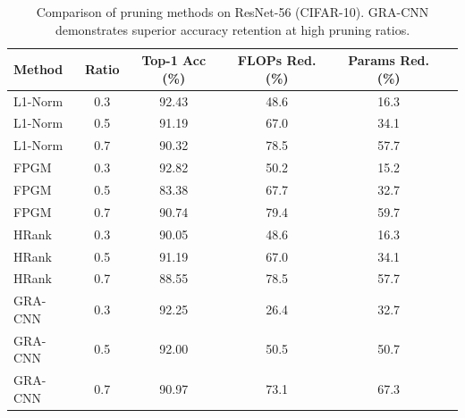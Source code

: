 \begin{table}[ht]
\centering
\caption{Comparison of pruning methods on ResNet-56 (CIFAR-10). GRA-CNN demonstrates superior accuracy retention at high pruning ratios.}
\label{tab:cifar10_results}
\begin{tabular}{lccccc}
\toprule
Method & Ratio & Top-1 Acc (\%) & FLOPs Red. (\%) & Params Red. (\%) \\
\midrule
L1-Norm & 0.3 & 92.43 & 48.6 & 16.3 \\
L1-Norm & 0.5 & 91.19 & 67.0 & 34.1 \\
L1-Norm & 0.7 & 90.32 & 78.5 & 57.7 \\
FPGM & 0.3 & 92.82 & 50.2 & 15.2 \\
FPGM & 0.5 & 83.38 & 67.7 & 32.7 \\
FPGM & 0.7 & 90.74 & 79.4 & 59.7 \\
HRank & 0.3 & 90.05 & 48.6 & 16.3 \\
HRank & 0.5 & 91.19 & 67.0 & 34.1 \\
HRank & 0.7 & 88.55 & 78.5 & 57.7 \\
GRA-CNN & 0.3 & 92.25 & 26.4 & 32.7 \\
GRA-CNN & 0.5 & 92.00 & 50.5 & 50.7 \\
GRA-CNN & 0.7 & 90.97 & 73.1 & 67.3 \\
\bottomrule
\end{tabular}
\end{table}